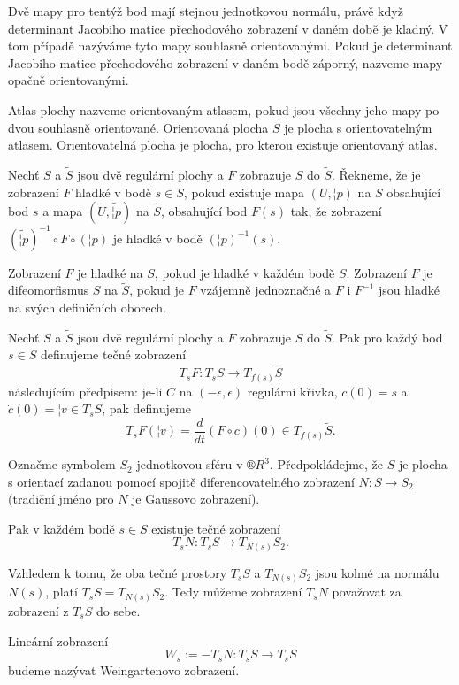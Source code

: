 \documentclass[12pt]{article}                   %
\begin{document}
        \begin{poznamka}
            Dvě mapy pro tentýž bod mají stejnou jednotkovou normálu, právě když determinant Jacobiho matice přechodového zobrazení v daném době je kladný. V tom případě nazýváme tyto mapy souhlasně orientovanými. Pokud je determinant Jacobiho matice přechodového zobrazení v daném bodě záporný, nazveme mapy opačně orientovanými.

            Atlas plochy nazveme orientovaným atlasem, pokud jsou všechny jeho mapy po dvou souhlasně orientované. Orientovaná plocha $S$ je plocha s orientovatelným atlasem. Orientovatelná plocha je plocha, pro kterou existuje orientovaný atlas.
        \end{poznamka}

        \begin{definice}
            Nechť $S$ a $\tilde{S}$ jsou dvě regulární plochy a $F$ zobrazuje $S$ do $\tilde{S}$. Řekneme, že je zobrazení $F$ hladké v bodě $s \in S$, pokud existuje mapa $(U, ¦p)$ na $S$ obsahující bod $s$ a mapa $(\tilde{U}, \tilde{¦p})$ na $\tilde{S}$, obsahující bod $F(s)$ tak, že zobrazení $(\tilde{¦p})^{-1}\circ F \circ (¦p)$ je hladké v bodě $(¦p)^{-1}(s)$.

            Zobrazení $F$ je hladké na $S$, pokud je hladké v každém bodě $S$. Zobrazení $F$ je difeomorfismus $S$ na $\tilde{S}$, pokud je $F$ vzájemně jednoznačné a $F$ i $F^{-1}$ jsou hladké na svých definičních oborech.
        \end{definice}

        \begin{definice}
            Nechť $S$ a $\tilde{S}$ jsou dvě regulární plochy a $F$ zobrazuje $S$ do $\tilde{S}$. Pak pro každý bod $s \in S$ definujeme tečné zobrazení
            $$ T_sF: T_sS \rightarrow T_{f(s)}\tilde{S} $$
            následujícím předpisem: je-li $C$ na $(-\epsilon, \epsilon)$ regulární křivka, $c(0) = s$ a $\dot{c}(0) = ¦v \in T_sS$, pak definujeme
            $$ T_sF(¦v) = \frac{d}{dt}(F \circ c)(0) \in T_{f(s)}\tilde{S}. $$ 
        \end{definice}

        \begin{definice}
            Označme symbolem $S_2$ jednotkovou sféru v $®R^3$. Předpokládejme, že $S$ je plocha s orientací zadanou pomocí spojitě diferencovatelného zobrazení $N: S \rightarrow S_2$ (tradiční jméno pro $N$ je Gaussovo zobrazení).

            Pak v každém bodě $s \in S$ existuje tečné zobrazení
            $$ T_sN: T_sS \rightarrow T_{N(s)}S_2. $$

            Vzhledem k tomu, že oba tečné prostory $T_sS$ a $T_{N(s)}S_2$ jsou kolmé na normálu $N(s)$, platí $T_sS = T_{N(s)}S_2$. Tedy můžeme zobrazení $T_sN$ považovat za zobrazení z $T_sS$ do sebe.

            Lineární zobrazení
            $$ W_s := -T_sN: T_sS \rightarrow T_sS $$
            budeme nazývat Weingartenovo zobrazení.
        \end{definice}
\end{document}
